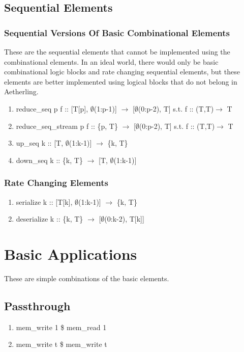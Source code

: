 \documentclass[11pt,fleqn]{article}
\numberwithin{equation}{subsection}
\begin{document}
\subsection{Sequential Elements}

\subsubsection{Sequential Versions Of Basic Combinational Elements}
These are the sequential elements that cannot be implemented using the
combinational elements. In an ideal world, there would only be basic
combinational logic blocks and rate changing sequential elements, but these
elements are better implemented using logical blocks that do not belong in
Aetherling.
\begin{enumerate}
    \item reduce\_seq p f :: [T[p], $\emptyset$(1:p-1)] $\rightarrow$ [$\emptyset$(0:p-2), T]
        \subitem s.t. f :: (T,T)$\rightarrow$ T
    \item reduce\_seq\_stream p f :: \{p, T\} $\rightarrow$ [$\emptyset$(0:p-2), T]
        \subitem s.t. f :: (T,T)$\rightarrow$ T
    \item up\_seq k :: [T, $\emptyset$(1:k-1)] $\rightarrow$ \{k, T\}
    \item down\_seq k :: \{k, T\} $\rightarrow$ [T, $\emptyset$(1:k-1)]
\end{enumerate}

\subsubsection{Rate Changing Elements}

\begin{enumerate}
    \item serialize k :: [T[k], $\emptyset$(1:k-1)] $\rightarrow$ \{k, T\}
    \item deserialize k :: \{k, T\} $\rightarrow$ [$\emptyset$(0:k-2), T[k]]
\end{enumerate}

\section{Basic Applications}
These are simple combinations of the basic elements.

\subsection{Passthrough}
\begin{enumerate}
    \item mem\_write 1 \$ mem\_read 1
    \item mem\_write t \$ mem\_write t 
\end{enumerate}
\end{document}
